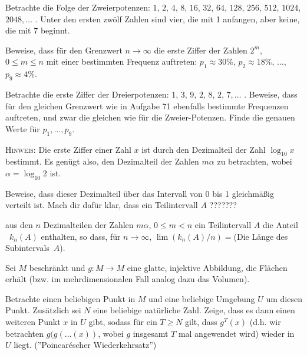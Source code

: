 \documentclass[12pt]{article} %
\begin{document}
\bigskip
{} Betrachte die Folge der Zweierpotenzen: $1$, $2$, $4$, $8$, $16$, $32$, $64$, $128$, $256$, $512$, $1024$, $2048, \dots$ . Unter den ersten zwölf Zahlen sind vier, die mit 1 anfangen, aber keine, die mit 7 beginnt. 

Beweise, dass für den Grenzwert $n \to \infty$ die erste Ziffer der Zahlen $2^m$,
$0\leqslant m \leqslant n$ mit einer bestimmten Frequenz auftreten: 
$p_1 \approx 30\%$, $p_2 \approx 18\%$, $\dots$, $p_9 \approx 4\%$.

\bigskip
{} Betrachte die erste Ziffer der Dreierpotenzen: $1$,
$3$, $9$, $2$, $8$, $2$, $7, \dots$ . Beweise, dass für den gleichen Grenzwert wie in Aufgabe 71 ebenfalls bestimmte Frequenzen auftreten, und zwar die gleichen wie für die Zweier-Potenzen. Finde die genauen Werte für $p_1, \dots, p_9$.

\medskip
\textsc{Hinweis:} Die erste Ziffer einer Zahl $x$ ist durch den Dezimalteil der Zahl 
$\log_{10} x$ bestimmt. Es genügt also, den Dezimalteil der Zahlen $m \alpha$ zu betrachten, wobei $\alpha=\log_{10} 2$ ist.

Beweise, dass dieser Dezimalteil über das Intervall von 0 bis 1 gleichmäßig verteilt ist. Mach dir dafür klar, dass ein Teilintervall $A$ ???????

aus den $n$ Dezimalteilen der Zahlen $m \alpha$, $0 \leqslant m<n$ ein Teilintervall $A$  die Anteil ~$k_n (A)$ enthalten, so dass, für $n \to \infty$,
$\lim (k_n (A)/n)={}$(Die Länge des Subintervals~$A$).
\pagebreak[3]

\bigskip
{} Sei $M$ beschränkt und $g\colon M \to M$ eine glatte, injektive Abbildung, die Flächen erhält (bzw. im mehrdimensionalen Fall analog dazu das Volumen). 


Betrachte einen beliebigen Punkt in $M$ und eine beliebige Umgebung $U$ um diesen Punkt. Zusätzlich sei $N$ eine beliebige natürliche Zahl. 
Zeige, dass es dann einen weiteren Punkt $x$ in $U$ gibt, sodass für ein $T\geq N$ gilt, dass $g^T (x)$ (d.h. wir betrachten $g(g(\dots (x))$, wobei $g$ insgesamt $T$ mal angewendet wird) wieder in $U$ liegt.
(''Poincaréscher Wiederkehrsatz'')
\end{document}
